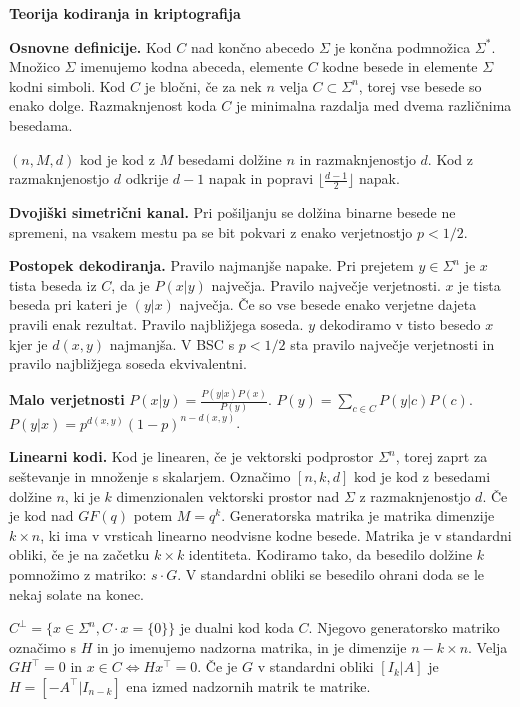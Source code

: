 \documentclass[a4paper, oneside, 10pt]{article}
\title{\mytitle}
\author{Jure Slak}
\date{\today}
\theoremstyle{definition}
\begin{document}
\pagestyle{empty}

\begin{center}
  \bf \Large Teorija kodiranja in kriptografija
\end{center}

\textbf{Osnovne definicije.} Kod $C$ nad končno abecedo $\Sigma$ je končna podmnožica
$\Sigma^\ast$. Množico $\Sigma$ imenujemo kodna abeceda, elemente $C$ kodne besede in
elemente $\Sigma$ kodni simboli. Kod $C$ je bločni, če za nek $n$ velja $C \subset
\Sigma^n$, torej vse besede so enako dolge. Razmaknjenost koda $C$ je minimalna razdalja
med dvema različnima besedama. 

$(n,M,d)$ kod je kod z $M$ besedami dolžine $n$ in razmaknjenostjo $d$. Kod z
razmaknjenostjo $d$ odkrije $d-1$ napak in popravi $\lfloor\frac{d-1}{2}\rfloor$ napak.

\textbf{Dvojiški simetrični kanal.} Pri pošiljanju se dolžina binarne besede ne spremeni,
na vsakem mestu pa se bit pokvari z enako verjetnostjo $p < 1/2$.

\textbf{Postopek dekodiranja.} Pravilo najmanjše napake. Pri prejetem $y \in \Sigma^n$ je
$x$ tista beseda iz $C$, da je $P(x|y)$ največja. Pravilo največje verjetnosti. $x$ je
tista beseda pri kateri je $(y|x)$ največja. Če so vse besede enako verjetne dajeta
pravili enak rezultat. Pravilo najbližjega soseda. $y$ dekodiramo v tisto besedo $x$ kjer
je $d(x,y)$ najmanjša. V BSC s $p<1/2$ sta pravilo največje verjetnosti in pravilo
najbližjega soseda ekvivalentni.

\textbf{Malo verjetnosti}
$P(x|y) = \frac{P(y|x)P(x)}{P(y)}$. $P(y) = \sum_{c\in C}P(y|c)P(c)$. $P(y|x) =
p^{d(x,y)}(1-p)^{n-d(x,y)}$.

\textbf{Linearni kodi.} Kod je linearen, če je vektorski podprostor $\Sigma^n$, torej zaprt
za seštevanje in množenje s skalarjem. Označimo $[n,k,d]$ kod je kod z besedami dolžine
$n$, ki je $k$ dimenzionalen vektorski prostor nad $\Sigma$ z razmaknjenostjo $d$. Če je
kod nad $GF(q)$ potem $M = q^k$. Generatorska matrika je matrika dimenzije $k\times n$, ki
ima v vrsticah linearno neodvisne kodne besede. Matrika je v standardni obliki, če je na
začetku $k\times k$ identiteta. Kodiramo tako, da besedilo dolžine $k$ pomnožimo z matriko: $s\cdot
G$. V standardni obliki se besedilo ohrani doda se le nekaj solate na konec. 

$C^\perp = \{ x\in \Sigma^n, C\cdot x = \{0\}\}$ je dualni kod koda $C$. Njegovo
generatorsko matriko označimo s $H$ in jo imenujemo nadzorna matrika, in je dimenzije $n-k\times n$. Velja $GH^\top=0$ in $x
\in C \iff Hx^\top = 0$. Če je $G$ v standardni obliki $[I_k| A]$ je $H = [-A^\top|I_{n-k}]$ ena
izmed nadzornih matrik te matrike. 
\end{document}
